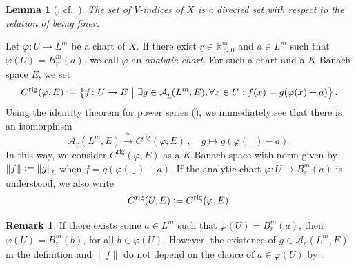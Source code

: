 \documentclass[a4paper, reqno, 10pt]{amsart}
\newtheorem{lemma}[theorem]{Lemma}
\theoremstyle{definition}
\newtheorem{remark}[theorem]{Remark}
\numberwithin{equation}{section}
\newcommand{\blank}{{\,\_\,}}
\newcommand{\defeq}{\vcentcolon=}
\newcommand{\lra}{\longrightarrow}
\newcommand{\lto}{\longmapsto}
\newcommand{\norm}[1]{\lVert{#1}\rVert}
\newcommand{\ra}{\rightarrow}
\newcommand{\ul}[1]{{\underline{#1}}}
\let\originalmiddle\middle
\renewcommand{\middle}[1]{\,\originalmiddle#1\,}
\newcommand{\BR}{{\mathbb {R}}}
\newcommand{\CA}{{\mathcal {A}}}
\newcommand{\aan}{{\mathrm{rig}}}
\begin{document}
\begin{lemma}[{\cite[Bem.\ 2.1.9]{FeauxdeLacroix99TopDarstpAdischLieGrp}, cf.\ \cite[Lemma 10.2]{Schneider11pAdicLieGrps}}]
	The set of $V$-indices of $X$ is a directed set with respect to the relation of being finer.
\end{lemma}





Let $\varphi \colon U \ra L^m$ be a chart of $X$.
If there exist $\ul{r}\in \BR_{>0}^m$ and $a\in L^m$ such that \mbox{$\varphi(U) = B_\ul{r}^{m}(a)$}, we call $\varphi$ an \textit{analytic chart}.
For such a chart and a $K$-Banach space $E$, we set
\begin{equation*}
	C^\aan (\varphi,E) \defeq \left\{ f\colon U \ra E \middle{|} \exists g \in \CA_\ul{r}(L^m,E) ,  \forall x \in U : f(x) = g(\varphi(x)-a)\right\}.
\end{equation*}
Using the identity theorem for power series (), we immediately see that there is an isomorphism
\begin{equation*}
	\CA_\ul{r}(L^m, E) \overset{\cong}{\lra} C^\aan(\varphi,E) \,,\quad g \lto g(\varphi(\blank)-a) .
\end{equation*}
In this way, we consider $C^\aan(\varphi,E)$ as a $K$-Banach space with norm given by $\norm{f}\defeq \norm{g}_\ul{r}$ when $f = g(\varphi(\blank)-a)$.
If the analytic chart $\varphi\colon U \ra B^{m}_{\ul{r}}(a)$ is understood, we also write
\begin{equation*}
	C^\aan (U,E) \defeq C^\aan (\varphi, E).
\end{equation*}

\begin{remark}
	If there exists some $a\in L^m$ such that $\varphi(U)= B_\ul{r}^{m} (a)$, then $\varphi(U)= B_\ul{r}^{m}(b)$, for all $b\in \varphi(U)$.
	However, the existence of $g\in \CA_\ul{r}(L^m,E)$ in the definition and $\norm{f}$ do not depend on the choice of $a\in \varphi(U)$ by .
\end{remark}
\end{document}

